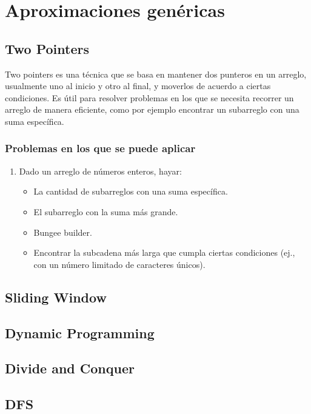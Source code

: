 \section{Aproximaciones genéricas}

\subsection{Two Pointers}

Two pointers es una técnica que se basa en mantener dos punteros en un arreglo, usualmente uno al inicio y otro al final, y moverlos de acuerdo a ciertas condiciones. Es útil para resolver problemas en los que se necesita recorrer un arreglo de manera eficiente, como por ejemplo encontrar un subarreglo con una suma específica. 

\subsubsection{Problemas en los que se puede aplicar}
\begin{enumerate}
  \item Dado un arreglo de números enteros, hayar:
  \begin{itemize}
    \item La cantidad de subarreglos con una suma específica. 
    \item El subarreglo con la suma más grande. 
    \item Bungee builder. 
    \item Encontrar la subcadena más larga que cumpla ciertas condiciones (ej., con un número limitado de caracteres únicos).

  \end{itemize}
\end{enumerate}


\subsection{Sliding Window}

\subsection{Dynamic Programming}

\subsection{Divide and Conquer}

\subsection{DFS}


